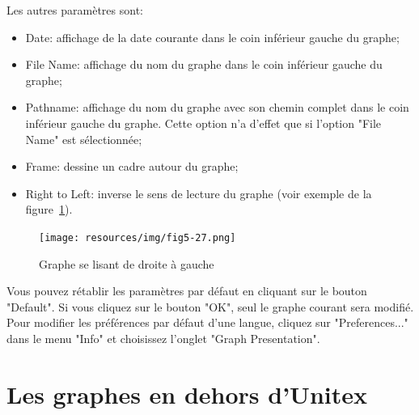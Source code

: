\bigskip
\noindent Les autres paramètres sont:
\begin{itemize}
  \item Date: affichage de la date courante dans le coin inférieur gauche du graphe;
  \item File Name: affichage du nom du graphe dans le coin inférieur gauche du graphe;
  \item Pathname: affichage du nom du graphe avec son chemin complet dans le coin inférieur
gauche du graphe. Cette option n’a d’effet que si l’option "File Name" est sélectionnée;
  \item Frame: dessine un cadre autour du graphe;
  \item Right to Left: inverse le sens de lecture du graphe (voir exemple de la
  		  figure~\ref{fig-right-to-left-graph}).
\end{itemize}

\bigskip
\begin{figure}[!ht]
\begin{center}
\texttt{[image: resources/img/fig5-27.png]}
\caption{Graphe se lisant de droite à gauche\label{fig-right-to-left-graph}}
\end{center}
\end{figure}

\bigskip
\noindent Vous pouvez rétablir les paramètres par défaut en cliquant sur le bouton "Default".
Si vous cliquez sur le bouton "OK", seul le graphe courant sera modifié.
Pour modifier les préférences par défaut d’une langue, cliquez sur "Preferences..." dans le
menu "Info" et choisissez l’onglet "Graph Presentation".



\section{Les graphes en dehors d’Unitex}
\label{exporting-graphs}
